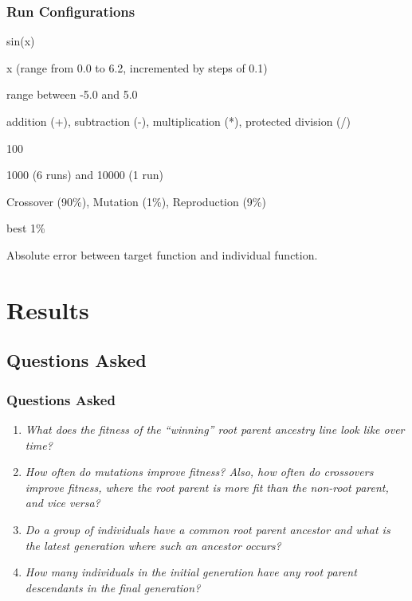 \documentclass{beamer}
\begin{document}
\begin{frame}
\frametitle{Run Configurations}
\begin{description}[align=left, leftmargin=*]
\item[Target Function] sin(x)
\item[Variables] x (range from 0.0 to 6.2, incremented by steps of 0.1)
\item[Constants] range between -5.0 and 5.0
\item[Operations] addition (+), subtraction (-), multiplication (*), protected division (/)
\item[Generation Number] 100
\item[Population Size Per Generation] 1000 (6 runs) and 10000 (1 run)
\item[Transformation Percentages] Crossover (90\%), Mutation (1\%), Reproduction (9\%)
\item[Elitism] best 1\%
\item[Fitness] Absolute error between target function and individual function.
\end{description}
\end{frame}

\section[Results]{Results}

\subsection[Questions Asked]{Questions Asked}

\begin{frame}
\frametitle{Questions Asked}
\begin{enumerate}
\item \emph{What does the fitness of the ``winning'' root parent ancestry line look like over time?}
\item \emph{How often do mutations improve fitness? Also, how often do crossovers improve fitness, where the root parent is more fit than the non-root parent, and vice versa?}
\item \emph{Do a group of individuals have a common root parent ancestor and what is the latest generation where such an ancestor occurs?}
\item \emph{How many individuals in the initial generation have any root parent descendants in the final generation?}
\end{enumerate}
\end{frame}
\end{document}
